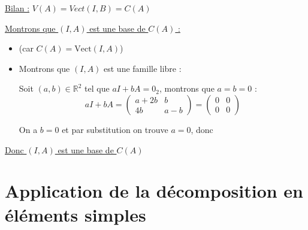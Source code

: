 \documentclass[11pt]{article}
\newcommand{\R}{\mathbb{R}}
\newcommand{\vect}{\text{Vect}}
\begin{document}
\begin{enumerate}
\begin{itemize}
				\underline{Bilan :} \(V(A) = Vect(I, B) = C(A)\)
				
			\end{itemize}
			\bigskip
		
			\underline{Montrons que \((I,A)\) est une base de \(C(A)\) :}
			
			\begin{itemize}
				\renewcommand{\labelitemi}{$\circ$}
				\item {} (car \(C(A) = \vect(I,A)\))
				\item Montrons que \((I, A)\) est une famille libre : 
				
				Soit \((a,b) \in \R^2\) tel que \(aI + bA = 0_2\), montrons que \(a = b = 0\) :
				\[
					aI + bA = 
					\begin{pmatrix}
						a + 2b & b\\
						4b & a - b
					\end{pmatrix} = 
					\begin{pmatrix}
						0 & 0\\
						0 & 0
					\end{pmatrix}
				\]
				
				On a \(b = 0\) et par substitution on trouve \(a = 0\), donc 
				
				\end{itemize}
			
				\underline{Donc \((I,A)\) est une base de \(C(A)\)}
	\end{enumerate}

	\section{Application de la décomposition en éléments simples}
	
\end{document}

